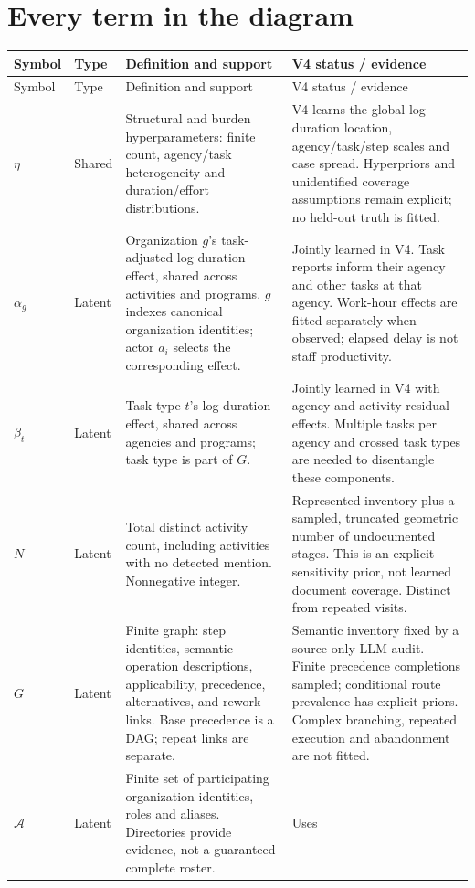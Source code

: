 \documentclass[11pt]{article}
\newcommand{\entry}[5]{\ensuremath{#2} & #3 & #4 & #5 \\[5pt]}
\begin{document}
\section{Every term in the diagram}
\small
\setlength{\tabcolsep}{4pt}
\begin{longtable}{@{}>{\raggedright\arraybackslash}p{1.6cm}>{\raggedright\arraybackslash}p{1.5cm}>{\raggedright\arraybackslash}p{6.2cm}>{\raggedright\arraybackslash}p{5.7cm}@{}}
\toprule Symbol & Type & Definition and support & V4 status / evidence \\
\midrule\endfirsthead
\toprule Symbol & Type & Definition and support & V4 status / evidence \\
\midrule\endhead
\bottomrule\endfoot
\entry{eta}{\eta}{Shared}{Structural and burden hyperparameters: finite count,
agency/task heterogeneity and duration/effort distributions.}{V4 learns the global
log-duration location, agency/task/step scales and case spread. Hyperpriors and
unidentified coverage assumptions remain explicit; no held-out truth is fitted.}
\entry{alpha}{\alpha_g}{Latent}{Organization $g$'s task-adjusted log-duration effect,
shared across activities and programs. $g$ indexes canonical organization identities;
actor $a_i$ selects the corresponding effect.}{Jointly learned in V4. Task reports
inform their agency and other tasks at that agency. Work-hour effects are fitted
separately when observed; elapsed delay is not staff productivity.}
\entry{beta}{\beta_t}{Latent}{Task-type $t$'s log-duration effect, shared across
agencies and programs; task type is part of $G$.}{Jointly learned in V4 with agency
and activity residual effects. Multiple tasks per agency and crossed task types
are needed to disentangle these components.}
\entry{N}{N}{Latent}{Total distinct activity count, including activities with no
detected mention. Nonnegative integer.}{Represented inventory plus a sampled,
truncated geometric number of undocumented stages. This is an explicit sensitivity
prior, not learned document coverage. Distinct from repeated visits.}
\entry{G}{G}{Latent}{Finite graph: step identities, semantic operation descriptions,
applicability, precedence, alternatives, and rework links. Base precedence is a
DAG; repeat links are separate.}{Semantic inventory fixed by a source-only LLM audit.
Finite precedence completions sampled; conditional route prevalence has explicit
priors. Complex branching, repeated execution and abandonment are not fitted.}
\entry{A}{\mathcal A}{Latent}{Finite set of participating organization identities,
roles and aliases. Directories provide evidence, not a guaranteed complete roster.}{Uses
}
\end{longtable}
\end{document}
